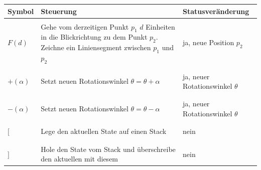 \documentclass[11pt]{article}
\begin{document}
    \begin{center}
        \begin{tabular}{lll}
            \textbf{Symbol} & \textbf{Steuerung} & \textbf{Statusveränderung} \\
            \hline \\
            $F(d)$ &
            \begin{minipage}{0.6\textwidth}
                Gehe vom derzeitigen Punkt $p_1$ $d$ Einheiten in die Blickrichtung zu dem Punkt $p_2$.
                Zeichne ein Liniensegment zwischen $p_1$ und $p_2$
            \end{minipage} &
            \begin{minipage}{0.4\textwidth}
                ja, neue Position $p_2$
            \end{minipage} \\
            \\ \hline \\
            $+(\alpha)$ &
            \begin{minipage}{0.6\textwidth}
                Setzt neuen Rotationswinkel $\theta=\theta+\alpha$
            \end{minipage} &
            \begin{minipage}{0.4\textwidth}
                ja, neuer Rotationswinkel $\theta$
            \end{minipage} \\
            \\ \hline \\
            $-(\alpha)$ &
            \begin{minipage}{0.6\textwidth}
                Setzt neuen Rotationswinkel $\theta=\theta-\alpha$
            \end{minipage} &
            \begin{minipage}{0.4\textwidth}
                ja, neuer Rotationswinkel $\theta$
            \end{minipage} \\
            \\ \hline \\
            $[$ &
            \begin{minipage}{0.6\textwidth}
                Lege den aktuellen State auf einen Stack
            \end{minipage} &
            \begin{minipage}{0.4\textwidth}
                nein
            \end{minipage} \\
            \\ \hline \\
            $]$ &
            \begin{minipage}{0.6\textwidth}
                Hole den State vom Stack und überschreibe den aktuellen mit diesem
            \end{minipage} &
            \begin{minipage}{0.4\textwidth}
                nein
            \end{minipage}
        \end{tabular}
    \end{center}
\end{document}
